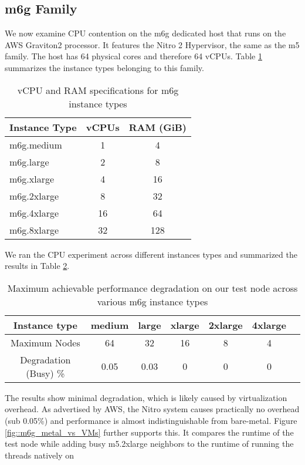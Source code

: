 \subsection{m6g Family}
We now examine CPU contention on the m6g dedicated host that runs on the AWS Graviton2 
processor. It features the Nitro 2 Hypervisor, the same as the m5 family. The host has 
64 physical cores and therefore 64 vCPUs. Table \ref{tab::m6g_specs} summarizes the instance types 
belonging to this family.
\begin{table}[H]
\centering
\begin{tabular}{l|c|c}
\hline
\textbf{Instance Type} & \textbf{vCPUs} & \textbf{RAM (GiB)} \\
\hline
m6g.medium   & 1  & 4   \\
m6g.large    & 2  & 8   \\
m6g.xlarge   & 4  & 16  \\
m6g.2xlarge  & 8  & 32  \\
m6g.4xlarge  & 16 & 64  \\
m6g.8xlarge  & 32 & 128 \\
\hline
\end{tabular}
\caption{vCPU and RAM specifications for m6g instance types}
\label{tab::m6g_specs}
\end{table}
\noindent
We ran the CPU experiment across different instances types and summarized the results in 
Table \ref{tab::max_m6g}. 
\begin{table}[H]
\begin{center}
\begin{tabular}{ c|c|c|c|c|c|c }
 Instance type & medium & large & xlarge & 2xlarge & 4xlarge \\
 \hline
 Maximum Nodes & 64 & 32 & 16 & 8 & 4 \\
\hline
Degradation (Busy) \%& 0.05 & 0.03 & 0 & 0 & 0 \\
\end{tabular}
\end{center}
\caption{Maximum achievable performance degradation on our test node across various m6g instance types}
\label{tab::max_m6g}
\end{table}
\noindent 
The results show minimal degradation, which is likely caused by virtualization overhead. As 
advertised by AWS, the Nitro system causes practically no overhead (sub 0.05\%) 
and performance is almost indistinguishable from bare-metal.  
Figure \ref{fig::m6g_metal_vs_VMs} further supports this. It compares the runtime of the test node while
adding busy m5.2xlarge neighbors  to the runtime of running the threads natively on 
